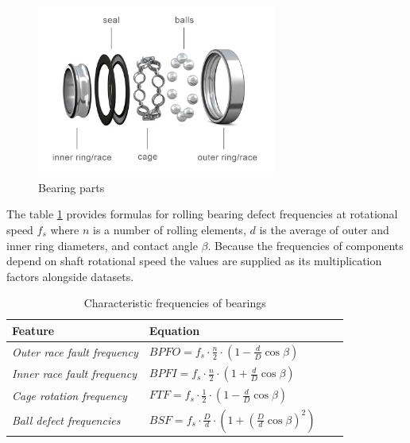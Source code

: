\begin{figure}[h]
    \centering
    \includegraphics[width=0.7\textwidth]{assets/analysis/bearing-parts.jpg}
    \caption{Bearing parts~\cite{lu_what_is_ball_bearing_2023}}
    \label{fig:bearing-parts}
\end{figure}

The table \ref{tab:bearing-defect-features} provides formulas for rolling bearing defect frequencies at rotational speed $f_s$ where $n$ is a number of rolling elements, $d$ is the average of outer and inner ring diameters, and contact angle $\beta$. Because the frequencies of components depend on shaft rotational speed the values are supplied as its multiplication factors alongside datasets.

\begin{table}[h]
\centering
\renewcommand{\arraystretch}{2}
\begin{tabular}{|l|l|l|l|}
\hline
\textbf{Feature}            & \textbf{Equation}                                                                   
 \\ \hline
\textit{Outer race fault frequency} & $ BPFO = f_s \cdot \frac{n}{2} \cdot \left(1 - \frac{d}{D}\cos \beta \right)$               
\\ \hline
\textit{Inner race fault frequency} & $ BPFI = f_s \cdot \frac{n}{2} \cdot \left(1 + \frac{d}{D}\cos \beta \right)$
\\ \hline
\textit{Cage rotation frequency}    & $ FTF = f_s \cdot \frac{1}{2} \cdot \left(1 - \frac{d}{D}\cos \beta \right) $      
\\ \hline
\textit{Ball defect frequencies} & $ BSF = f_s \cdot \frac{D}{d} \cdot \left(1 + \left(\frac{D}{d}\cos \beta\right)^2 \right) $
\\ \hline
\end{tabular}
\caption{Characteristic frequencies of bearings}
\label{tab:bearing-defect-features}
\end{table}

